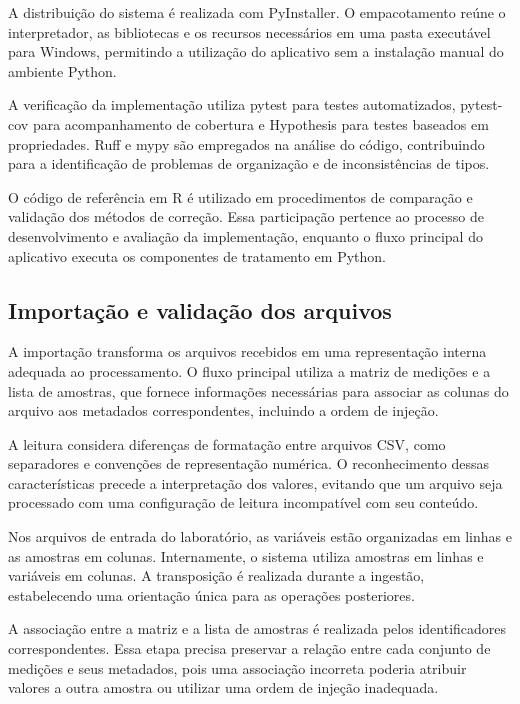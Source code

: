 A distribuição do sistema é realizada com PyInstaller. O empacotamento reúne o interpretador, as bibliotecas e os recursos necessários em uma pasta executável para Windows, permitindo a utilização do aplicativo sem a instalação manual do ambiente Python.

A verificação da implementação utiliza pytest para testes automatizados, pytest-cov para acompanhamento de cobertura e Hypothesis para testes baseados em propriedades. Ruff e mypy são empregados na análise do código, contribuindo para a identificação de problemas de organização e de inconsistências de tipos.

O código de referência em R é utilizado em procedimentos de comparação e validação dos métodos de correção. Essa participação pertence ao processo de desenvolvimento e avaliação da implementação, enquanto o fluxo principal do aplicativo executa os componentes de tratamento em Python.

\subsection{Importação e validação dos arquivos}
\label{subsec:importacao-validacao}

A importação transforma os arquivos recebidos em uma representação interna adequada ao processamento. O fluxo principal utiliza a matriz de medições e a lista de amostras, que fornece informações necessárias para associar as colunas do arquivo aos metadados correspondentes, incluindo a ordem de injeção.

A leitura considera diferenças de formatação entre arquivos CSV, como separadores e convenções de representação numérica. O reconhecimento dessas características precede a interpretação dos valores, evitando que um arquivo seja processado com uma configuração de leitura incompatível com seu conteúdo.

Nos arquivos de entrada do laboratório, as variáveis estão organizadas em linhas e as amostras em colunas. Internamente, o sistema utiliza amostras em linhas e variáveis em colunas. A transposição é realizada durante a ingestão, estabelecendo uma orientação única para as operações posteriores.

A associação entre a matriz e a lista de amostras é realizada pelos identificadores correspondentes. Essa etapa precisa preservar a relação entre cada conjunto de medições e seus metadados, pois uma associação incorreta poderia atribuir valores a outra amostra ou utilizar uma ordem de injeção inadequada.

